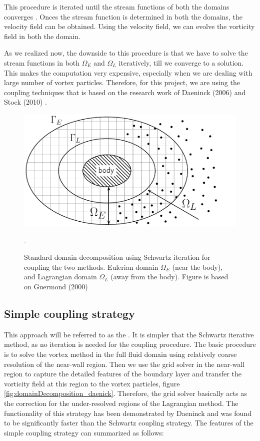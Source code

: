 This procedure is iterated until the stream functions of both the domains converges \cite{Ould-Salihi2001a}. Onces the stream function is determined in both the domains, the velocity field can be obtained. Using the velocity field, we can evolve the vorticity field in both the domain. 

As we realized now, the downside to this procedure is that we have to solve the stream functions in both $\Omega_E$ and $\Omega_L$ iteratively, till we converge to a solution. This makes the computation very expensive, especially when we are dealing with large number of vortex particles. Therefore, for this project, we are using the coupling techniques that is based on the research work of Daeninck (2006) \cite{Daeninck2006} and Stock (2010) \cite{Stock2010a}.

	\begin{figure}[!t]
		\centering
		\includegraphics[width=0.6\linewidth]{figures/introduction/domainDecomposition_typical_type2.pdf}
		\caption{Standard domain decomposition using Schwartz iteration for coupling the two methods. Eulerian domain $\Omega_E$ (near the body), and Lagrangian domain $\Omega_L$ (away from the body). Figure is based on Guermond (2000) \cite{Guermond2000a}}.
		\label{fig:domainDecomposition}
	\end{figure}

\subsection{Simple coupling strategy}
This approach will be referred to as the . It is simpler that the Schwartz iterative method, as no iteration is needed for the coupling procedure. The basic procedure is to solve the vortex method in the full fluid domain using relatively coarse resolution of the near-wall region. Then we use the grid solver in the near-wall region to capture the detailed features of the boundary layer and transfer the vorticity field at this region to the vortex particles, figure \ref{fig:domainDecomposition_daenick}. Therefore, the grid solver basically acts as the correction for the under-resolved regions of the Lagrangian method. The functionality of this strategy has been demonstrated by Daeninck and was found to be significantly faster than the Schwartz coupling strategy. The features of the simple coupling strategy can summarized as follows:

